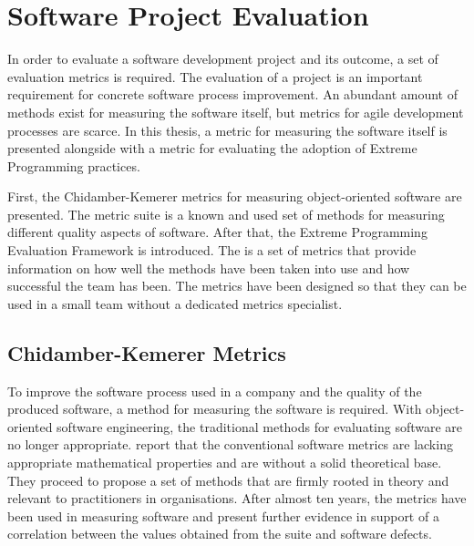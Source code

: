 \chapter{Software Project Evaluation}
\label{toc:evaluation}

In order to evaluate a software development project and its outcome, a 
set of evaluation metrics is required. The evaluation of a project is 
an important requirement for concrete software process improvement. An 
abundant amount of methods exist for measuring the software itself, 
but metrics for agile development processes are scarce. In this 
thesis, a metric for measuring the software itself is presented 
alongside with a metric for evaluating the adoption of Extreme 
Programming practices.

First, the Chidamber-Kemerer metrics \citep{oodmetrics} for measuring 
object-oriented software are presented. The  metric suite 
is a known and used set of methods for measuring different quality 
aspects of software. After that, the Extreme Programming Evaluation 
Framework \citep{xpevaluationfw} is introduced. The  is 
a set of metrics that provide information on how well the  
methods have been taken into use and how successful the team has been. 
The  metrics have been designed so that they can be used 
in a small team without a dedicated metrics specialist.


\section{Chidamber-Kemerer Metrics}
\label{toc:evaluation:ck}

To improve the software process used in a company and the quality of 
the produced software, a method for measuring the software is 
required. With object-oriented software engineering, the traditional 
methods for evaluating software are no longer appropriate. 
\cite{oodmetrics} report that the conventional software metrics are 
lacking appropriate mathematical properties and are without a solid 
theoretical base. They proceed to propose a set of methods that are 
firmly rooted in theory and relevant to practitioners in 
organisations. After almost ten years, the  metrics have 
been used in measuring software and \cite{ckanalysis} present further 
evidence in support of a correlation between the values obtained from 
the  suite and software defects.

